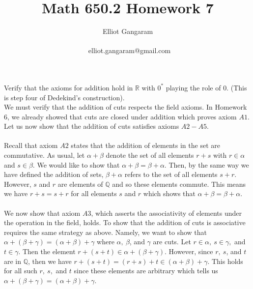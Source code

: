 \documentclass[12pt]{article}
\title{Math 650.2 Homework 7}
\author{Elliot Gangaram\\
\date{}
\ elliot.gangaram@gmail.com \\}
\begin{document}
\maketitle

\problem Verify that the axioms for addition hold in $\mathbb{R}$ with $0^{*}$ playing the role of 0. (This is step four of Dedekind's construction). \\ 

We must verify that the addition of cuts respects the field axioms. In Homework 6, we already showed that cuts are closed under addition which proves axiom $A1$. Let us now show that the addition of cuts satisfies axioms $A2-A5$. \\ \\

Recall that axiom $A2$ states that the addition of elements in the set are commutative. As usual, let $\alpha +\beta$ denote the set of all elements $r + s$ with $r \in \alpha$ and $s \in \beta$. We would like to show that $\alpha + \beta = \beta + \alpha$. Then, by the same way we have defined the addition of sets, $\beta +\alpha$ refers to the set of all elements $s + r$. However, $s$ and $r$ are elements of $\mathbb{Q}$ and so these elements commute. This means we have $r+s=s+r$ for all elements $s$ and $r$ which shows that $\alpha + \beta = \beta + \alpha$. \\ \\

We now show that axiom $A3$, which asserts the associativity of elements under the operation in the field, holds. To show that the addition of cuts is associative requires the same strategy as above. Namely, we want to show that $\alpha + (\beta + \gamma) = (\alpha + \beta) + \gamma$ where $\alpha, ~\beta$, and $\gamma$ are cuts. Let $r \in \alpha,~ s \in \gamma,$ and $t \in \gamma$. Then the element $r+(s+t) \in \alpha + (\beta + \gamma)$. However, since $r,~ s$, and $t$ are in $\mathbb{Q}$, then we have $r+(s+t)=(r+s)+t \in (\alpha + \beta) + \gamma$. This holds for all such $r,~s,$ and $t$ since these elements are arbitrary which tells us $\alpha + (\beta + \gamma) = (\alpha + \beta) + \gamma$. \\  \\
\end{document}
